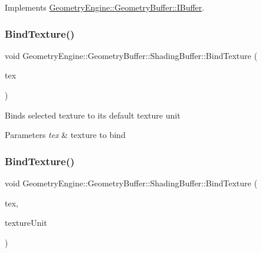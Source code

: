 Implements \mbox{\hyperlink{class_geometry_engine_1_1_geometry_buffer_1_1_i_buffer_a7fdf65d272575189e26ca13d169e8317}{Geometry\+Engine\+::\+Geometry\+Buffer\+::\+I\+Buffer}}.

\mbox{\label{class_geometry_engine_1_1_geometry_buffer_1_1_shading_buffer_a5c7fdd4a5e773750005956bdd923759e}} 
\subsubsection{\texorpdfstring{BindTexture()}{BindTexture()}\hspace{0.1cm}{\footnotesize\ttfamily [3/4]}}
{\footnotesize\ttfamily void Geometry\+Engine\+::\+Geometry\+Buffer\+::\+Shading\+Buffer\+::\+Bind\+Texture (\begin{DoxyParamCaption}\item[{\mbox{\hyperlink{class_geometry_engine_1_1_geometry_buffer_1_1_shading_buffer_a8047a079ff9fb9fa3400651664c92ae9}{S\+H\+A\+D\+I\+N\+G\+B\+U\+F\+F\+E\+R\+\_\+\+T\+E\+X\+T\+U\+R\+E\+\_\+\+T\+Y\+PE}}}]{tex }\end{DoxyParamCaption})}

Binds selected texture to its default texture unit 
\begin{DoxyParams}{Parameters}
{\em tex} & texture to bind \\
\hline
\end{DoxyParams}
\mbox{\label{class_geometry_engine_1_1_geometry_buffer_1_1_shading_buffer_a1122ec03dd6ffcaf19ac4370b1ef5cb8}} 
\subsubsection{\texorpdfstring{BindTexture()}{BindTexture()}\hspace{0.1cm}{\footnotesize\ttfamily [4/4]}}
{\footnotesize\ttfamily void Geometry\+Engine\+::\+Geometry\+Buffer\+::\+Shading\+Buffer\+::\+Bind\+Texture (\begin{DoxyParamCaption}\item[{\mbox{\hyperlink{class_geometry_engine_1_1_geometry_buffer_1_1_shading_buffer_a8047a079ff9fb9fa3400651664c92ae9}{S\+H\+A\+D\+I\+N\+G\+B\+U\+F\+F\+E\+R\+\_\+\+T\+E\+X\+T\+U\+R\+E\+\_\+\+T\+Y\+PE}}}]{tex,  }\item[{unsigned int}]{texture\+Unit }\end{DoxyParamCaption})}

